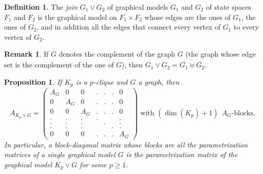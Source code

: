 \documentclass[11pt]{amsart}
\numberwithin{equation}{section}
\theoremstyle{plain}
\numberwithin{theorem}{section}
\newtheorem{proposition}[theorem]{Proposition}
\theoremstyle{definition}
\newtheorem{definition}[theorem]{Definition}
\newtheorem{remark}[theorem]{Remark}
\begin{document}
\begin{definition}\label{def: star}
The \textit{join} $G_1\vee G_2$ of graphical models $G_1$ and $G_2$ of state spaces $F_1$ and $F_2$ is the graphical model on $F_1\times F_2$ whose edges are the ones of $G_1$, the ones of $G_2$, and in addition all the edges that connect every vertex of $G_1$ to every vertex of $G_2$.
\end{definition}

\begin{remark}
If $\overline G$ denotes the complement of the graph $G$ (the graph whose edge set is the complement of the one of $G$), then $G_1\vee G_2=\overline{\overline{G_1}\uplus\overline{G_2}}$.
\end{remark}

\begin{proposition}\label{Proposition $2.24$:}
If $K_p$ is a $p$-clique  and $G$ a graph, then $$A_{K_p\vee G}=\left(\begin{smallmatrix}
    A_G & 0 & 0 & . & . & . & 0\\
    0 & A_G & 0 & . & . & . & 0\\
    0 & 0 & A_G & . & . & . & 0\\
    . & . & . & . & & & . \\
    . & . & . & & . & & . \\
    . & . & . & & & . & . \\
    0 & 0 & 0 & . & . & . & A_G
\end{smallmatrix}\right)\text{ with }(\dim(K_p)+1)~~A_G\text{-blocks.}$$
In particular, a block-diagonal matrix whose blocks are all the parametrization matrices of a single graphical model $G$ is the parametrization matrix of the graphical model $K_p\vee G$ for some $p\ge1$. 
\end{proposition}
\end{document}

